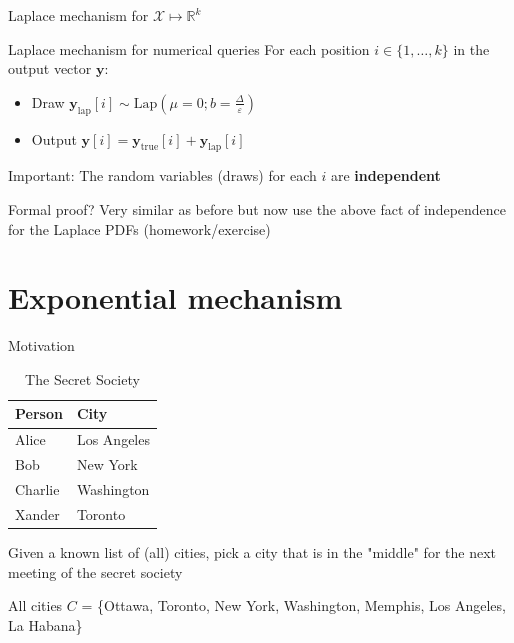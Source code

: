 \documentclass[12pt,aspectratio=169,handout]{beamer}
\begin{document}
\begin{frame}{Laplace mechanism for $\mathcal{X} \mapsto \mathbb{R}^k$}

\begin{block}{Laplace mechanism for numerical queries}
For each position $i \in \{1, \dots, k\}$ in the output vector $\mathbf{y}$:
\begin{itemize}
\item Draw $\mathbf{y}_{\mathrm{lap}}[i] \sim \textrm{Lap}(\mu = 0; b=\frac{\Delta}{\varepsilon})$
\item Output $\mathbf{y}[i] = \mathbf{y}_{\mathrm{true}}[i] + \mathbf{y}_{\mathrm{lap}}[i]$
\end{itemize}
\end{block}

Important: The random variables (draws) for each $i$ are \textbf{independent}

Formal proof? Very similar as before but now use the above fact of independence for the Laplace PDFs (homework/exercise)

\end{frame}

\section{Exponential mechanism}


\begin{frame}{Motivation}

\begin{table}
\scriptsize
\begin{tabular}{ll}
\toprule
Person & City \\ \midrule
Alice & Los Angeles \\
Bob & New York \\
Charlie & Washington \\
Xander & Toronto \\ \bottomrule
\end{tabular}
\caption{The Secret Society}
\end{table}

Given a known list of (all) cities, pick a city that is in the "middle" for the next meeting of the secret society

All cities $C$ = \{Ottawa, Toronto, New York, Washington, Memphis, Los Angeles, La Habana\}
\end{frame}
\end{document}
